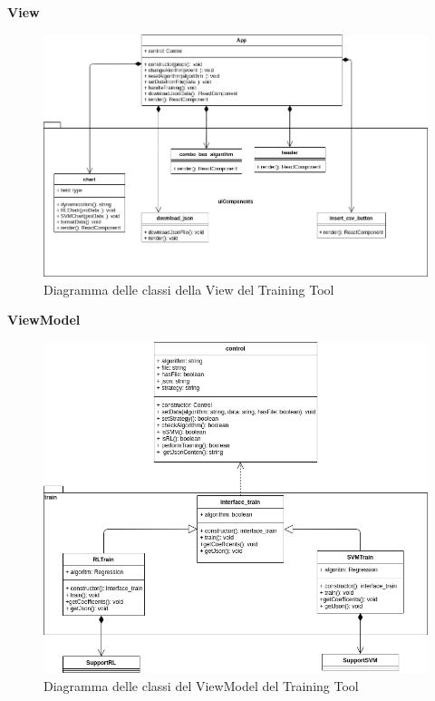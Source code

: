\textbf{View}
\begin{figure}[H]
\centering
\includegraphics[scale=0.5]{../../Diagrams/Classes_diagrams/tool_view.png}
\caption{Diagramma delle classi della View del Training Tool}
\end{figure}

\textbf{ViewModel}
\begin{figure}[H]
\centering
\includegraphics[scale=0.5]{../../Diagrams/Classes_diagrams/tool_modelview.png}
\caption{Diagramma delle classi del ViewModel del Training Tool}
\end{figure}


